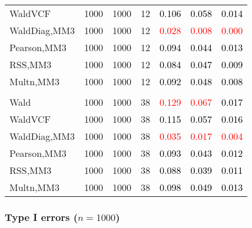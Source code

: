 \documentclass[
]{article}
\begin{document}
\begin{table}[H]
{\begin{tabular}[t]{lrrrrrr}
\hspace{1em}WaldVCF & 1000 & 1000 & 12 & \textcolor{black}{0.106} & \textcolor{black}{0.058} & \textcolor{black}{0.014}\\
\hspace{1em}WaldDiag,MM3 & 1000 & 1000 & 12 & \textcolor{red}{0.028} & \textcolor{red}{0.008} & \textcolor{red}{0.000}\\
\hspace{1em}Pearson,MM3 & 1000 & 1000 & 12 & \textcolor{black}{0.094} & \textcolor{black}{0.044} & \textcolor{black}{0.013}\\
\hspace{1em}RSS,MM3 & 1000 & 1000 & 12 & \textcolor{black}{0.084} & \textcolor{black}{0.047} & \textcolor{black}{0.009}\\
\hspace{1em}Multn,MM3 & 1000 & 1000 & 12 & \textcolor{black}{0.092} & \textcolor{black}{0.048} & \textcolor{black}{0.008}\\
\addlinespace[0.3em]
\multicolumn{7}{l}{\textbf{3F 15V}}\\
\hspace{1em}Wald & 1000 & 1000 & 38 & \textcolor{red}{0.129} & \textcolor{red}{0.067} & \textcolor{black}{0.017}\\
\hspace{1em}WaldVCF & 1000 & 1000 & 38 & \textcolor{black}{0.115} & \textcolor{black}{0.057} & \textcolor{black}{0.016}\\
\hspace{1em}WaldDiag,MM3 & 1000 & 1000 & 38 & \textcolor{red}{0.035} & \textcolor{red}{0.017} & \textcolor{red}{0.004}\\
\hspace{1em}Pearson,MM3 & 1000 & 1000 & 38 & \textcolor{black}{0.093} & \textcolor{black}{0.043} & \textcolor{black}{0.012}\\
\hspace{1em}RSS,MM3 & 1000 & 1000 & 38 & \textcolor{black}{0.088} & \textcolor{black}{0.039} & \textcolor{black}{0.011}\\
\hspace{1em}Multn,MM3 & 1000 & 1000 & 38 & \textcolor{black}{0.098} & \textcolor{black}{0.049} & \textcolor{black}{0.013}\\
\bottomrule
\end{tabular}}
\endgroup{}
\end{table}

\subsubsection{\texorpdfstring{Type I errors
(\(n=1000\))}{Type I errors (n=1000)}}\label{type-i-errors-n1000-2}
\end{document}
